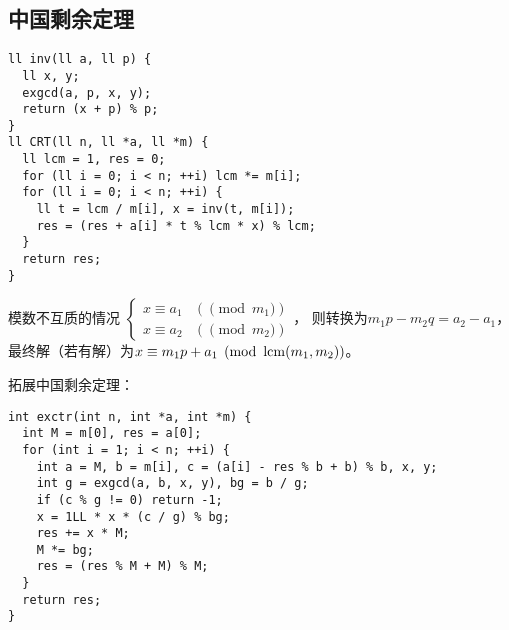 \subsection{中国剩余定理}
\begin{lstlisting}
ll inv(ll a, ll p) {
  ll x, y;
  exgcd(a, p, x, y);
  return (x + p) % p;
}
ll CRT(ll n, ll *a, ll *m) {
  ll lcm = 1, res = 0;
  for (ll i = 0; i < n; ++i) lcm *= m[i];
  for (ll i = 0; i < n; ++i) {
    ll t = lcm / m[i], x = inv(t, m[i]);
    res = (res + a[i] * t % lcm * x) % lcm;
  }
  return res;
}
\end{lstlisting}

模数不互质的情况
$
  \begin{cases}
    x \equiv a_{1} &(\pmod m_{1}) \\
    x \equiv a_{2} &(\pmod m_{2})
  \end{cases}
$，
则转换为$m_{1}p - m_{2}q = a_{2} - a_{1}$，
最终解（若有解）为$x \equiv m_{1}p + a_{1} \pmod{\operatorname{lcm}(m_{1}, m_{2})}$。

拓展中国剩余定理：
\begin{lstlisting}
int exctr(int n, int *a, int *m) {
  int M = m[0], res = a[0];
  for (int i = 1; i < n; ++i) {
    int a = M, b = m[i], c = (a[i] - res % b + b) % b, x, y;
    int g = exgcd(a, b, x, y), bg = b / g;
    if (c % g != 0) return -1;
    x = 1LL * x * (c / g) % bg;
    res += x * M;
    M *= bg;
    res = (res % M + M) % M;
  }
  return res;
}
\end{lstlisting}